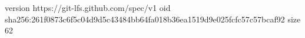 version https://git-lfs.github.com/spec/v1
oid sha256:261f0873c6f5c04d9d5c43484bb64fa018b36ea1519d9e025fcfc57c57bcaf92
size 62
